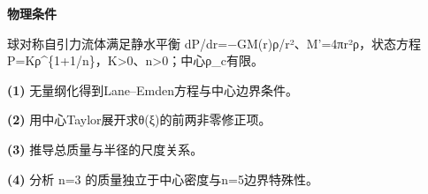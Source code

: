 \textbf{物理条件}\par 球对称自引力流体满足静水平衡 dP/dr=−GM(r)ρ/r²、M'=4πr²ρ，状态方程 P=Kρ\textasciicircum{}\{1+1/n\}，K>0、n>0；中心ρ\_c有限。
\par\noindent\textbf{(1)} 无量纲化得到Lane–Emden方程与中心边界条件。
\par\noindent\textbf{(2)} 用中心Taylor展开求θ(ξ)的前两非零修正项。
\par\noindent\textbf{(3)} 推导总质量与半径的尺度关系。
\par\noindent\textbf{(4)} 分析 n=3 的质量独立于中心密度与n=5边界特殊性。
